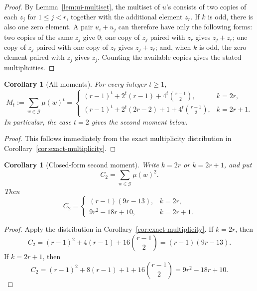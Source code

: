 \documentclass[11pt]{article}
\newtheorem{corollary}[theorem]{Corollary}
\theoremstyle{definition}
\theoremstyle{remark}
\begin{document}
\begin{proof}
By Lemma~\ref{lem:ui-multiset}, the multiset of \(u\)'s consists of two copies of each \(z_j\) for \(1\le j<r\), together with the additional element \(z_r\). If \(k\) is odd, there is also one zero element. A pair \(u_i+u_j\) can therefore have only the following forms: two copies of the same \(z_j\) give \(0\); one copy of \(z_j\) paired with \(z_r\) gives \(z_j+z_r\); one copy of \(z_j\) paired with one copy of \(z_\ell\) gives \(z_j+z_\ell\); and, when \(k\) is odd, the zero element paired with \(z_j\) gives \(z_j\). Counting the available copies gives the stated multiplicities.
\end{proof}

\begin{corollary}[All moments]\label{cor:all-moments}
For every integer \(t\ge1\),
\[
M_t:=\sum_{w\in\mathcal G}\mu(w)^t
=
\begin{cases}
(r-1)^t+2^t(r-1)+4^t\binom{r-1}{2}, & k=2r,\\[2mm]
(r-1)^t+2^t(2r-2)+1+4^t\binom{r-1}{2}, & k=2r+1.
\end{cases}
\]
In particular, the case \(t=2\) gives the second moment below.
\end{corollary}

\begin{proof}
This follows immediately from the exact multiplicity distribution in Corollary~\ref{cor:exact-multiplicity}.
\end{proof}

\begin{corollary}[Closed-form second moment]\label{cor:fourier-second-moment}
Write \(k=2r\) or \(k=2r+1\), and put
\[
C_2=\sum_{w\in\mathcal G}\mu(w)^2.
\]
Then
\begin{equation}\label{eq:C2}
C_2=
\begin{cases}
(r-1)(9r-13), & k=2r,\\[2mm]
9r^2-18r+10, & k=2r+1.
\end{cases}
\end{equation}
\end{corollary}

\begin{proof}
Apply the distribution in Corollary~\ref{cor:exact-multiplicity}. If \(k=2r\), then
\[
C_2=(r-1)^2+4(r-1)+16\binom{r-1}{2}
=(r-1)(9r-13).
\]
If \(k=2r+1\), then
\[
C_2=(r-1)^2+8(r-1)+1+16\binom{r-1}{2}
=9r^2-18r+10.
\]
\end{proof}
\end{document}
